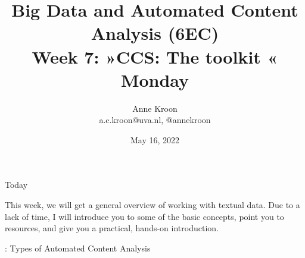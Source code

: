 

\graphicspath{{../../resources/img/}}




\title[Big Data and Automated Content Analysis]{\textbf{Big Data and Automated Content Analysis (6EC)} 
\\Week 7: »CCS: The toolkit «
\\Monday}
\author[Anne Kroon]{Anne Kroon\\ \footnotesize{a.c.kroon@uva.nl, @annekroon \\}}
\date{May 16, 2022}


\begin{frame}{}
	\titlepage
\end{frame}

\begin{frame}{Today}
	\tableofcontents
\end{frame}



\begin{frame}[standout]
This week, we will get a general overview of working with textual data. Due to a lack of time, I will introduce you to some of the basic concepts, point you to resources, and give you a practical, hands-on introduction. 
\end{frame}


\begin{frame}{\cite{Boumans2016}: Types of Automated Content Analysis}
\end{frame}

